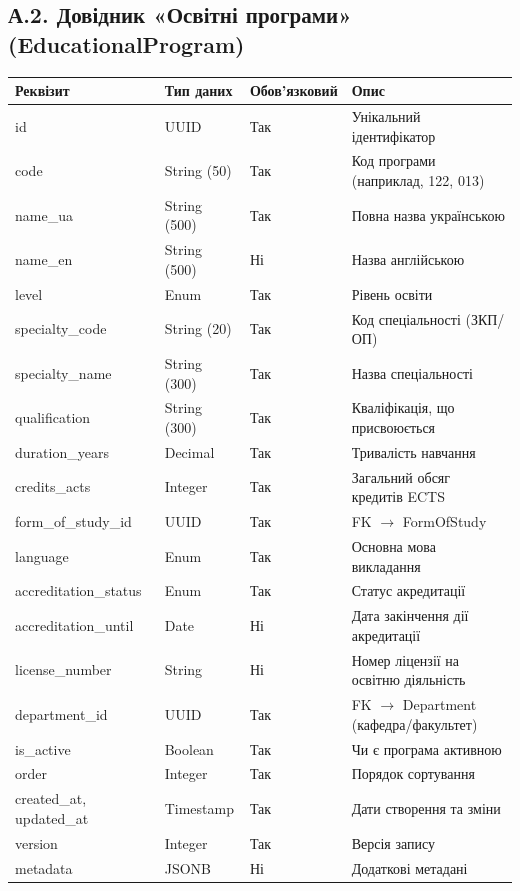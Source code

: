 \documentclass{article}
\begin{document}
\begin{appendix}
\subsection{А.2. Довідник «Освітні програми» (EducationalProgram)}
\begin{longtable}{p{3.5cm}p{3cm}p{2cm}p{5.5cm}}
\toprule
\textbf{Реквізит} & \textbf{Тип даних} & \textbf{Обов'язковий} & \textbf{Опис} \\
\midrule
id & UUID & Так & Унікальний ідентифікатор \\
code & String (50) & Так & Код програми (наприклад, 122, 013) \\
name\_ua & String (500) & Так & Повна назва українською \\
name\_en & String (500) & Ні & Назва англійською \\
level & Enum & Так & Рівень освіти \\
specialty\_code & String (20) & Так & Код спеціальності (ЗКП/ОП) \\
specialty\_name & String (300) & Так & Назва спеціальності \\
qualification & String (300) & Так & Кваліфікація, що присвоюється \\
duration\_years & Decimal & Так & Тривалість навчання \\
credits\_acts & Integer & Так & Загальний обсяг кредитів ECTS \\
form\_of\_study\_id & UUID & Так & FK $\rightarrow$ FormOfStudy \\
language & Enum & Так & Основна мова викладання \\
accreditation\_status & Enum & Так & Статус акредитації \\
accreditation\_until & Date & Ні & Дата закінчення дії акредитації \\
license\_number & String & Ні & Номер ліцензії на освітню діяльність \\
department\_id & UUID & Так & FK $\rightarrow$ Department (кафедра/факультет) \\
is\_active & Boolean & Так & Чи є програма активною \\
order & Integer & Так & Порядок сортування \\
created\_at, updated\_at & Timestamp & Так & Дати створення та зміни \\
version & Integer & Так & Версія запису \\
metadata & JSONB & Ні & Додаткові метадані \\
\bottomrule
\end{longtable}


\end{appendix}
\end{document}

